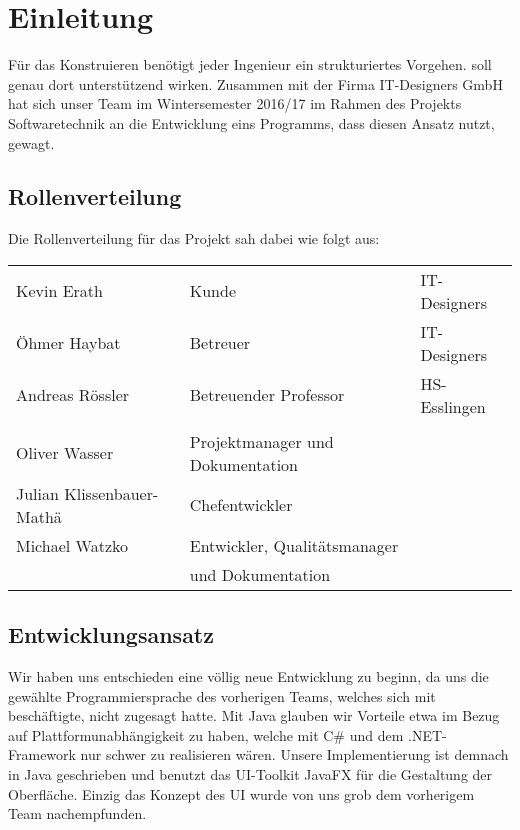 
\section{Einleitung}

Für das Konstruieren benötigt jeder Ingenieur ein strukturiertes Vorgehen. \textFlowDesign{}
soll genau dort unterstützend wirken.
Zusammen mit der Firma IT-Designers GmbH hat sich unser Team im Wintersemester 2016/17 im
Rahmen des Projekts Softwaretechnik an die Entwicklung eins Programms, dass diesen Ansatz
nutzt, gewagt.

\subsection{Rollenverteilung}
Die Rollenverteilung für das Projekt sah dabei wie folgt aus:

\begin{center}
	\begin{tabular}{l|l l}
		Kevin Erath & Kunde     & IT-Designers \\
		Öhmer Haybat & Betreuer & IT-Designers \\
		Andreas Rössler & Betreuender Professor & HS-Esslingen \\
		\\
		Oliver Wasser             & Projektmanager und Dokumentation & \\
		Julian Klissenbauer-Mathä & Chefentwickler & \\
		Michael Watzko            & Entwickler, Qualitätsmanager  \\
		                          & und Dokumentation \\
	\end{tabular}
\end{center}


\subsection{Entwicklungsansatz}
Wir haben uns entschieden eine völlig neue Entwicklung zu beginn, da uns die gewählte
Programmiersprache des vorherigen Teams, welches sich mit \textFlowDesign{} beschäftigte,
nicht zugesagt hatte. Mit Java glauben wir Vorteile etwa im Bezug auf 
Plattformunabhängigkeit zu haben, welche mit C\# und dem .NET-Framework nur schwer zu
realisieren wären. \newline
Unsere Implementierung ist demnach in Java geschrieben und benutzt das UI-Toolkit JavaFX
für die Gestaltung der Oberfläche. \newline
Einzig das Konzept des UI wurde von uns grob dem vorherigem Team nachempfunden.